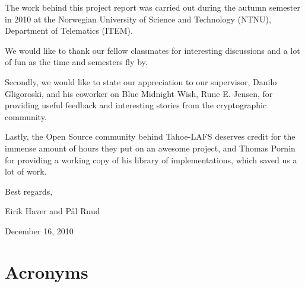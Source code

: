 \documentclass[english,12pt,a4paper]{book}
\begin{document}
The work behind this project report was carried out during the autumn semester
in 2010 at the Norwegian University of Science and Technology (NTNU), Department
of Telematics (ITEM).
\vspace{13pt}

We would like to thank our fellow classmates for interesting discussions and a
lot of fun as the time and semesters fly by.
\vspace{13pt}

Secondly, we would like to state our appreciation to our supervisor, Danilo
Gligoroski, and his coworker on Blue Midnight Wish, Rune E. Jensen, for
providing useful feedback and interesting stories from the cryptographic
community.
\vspace{13pt}

Lastly, the Open Source community behind Tahoe-LAFS deserves credit for the
immense amount of hours they put on an awesome project, and Thomas Pornin for
providing a working copy of his library of implementations, which saved us a lot
of work.
\vspace{13pt}

Best regards,

\begin{center}
Eirik Haver and Pål Ruud
\vspace{13pt}

December 16, 2010
\end{center}

\tableofcontents

\cleardoublepage
{}
{}
\listoffigures

\cleardoublepage
{}
{}
\listoftables

\cleardoublepage
{}
{}
\lstlistoflistings
\cleardoublepage

\chapter*{Acronyms}

\begin{acronym}
\end{acronym}
\end{document}
